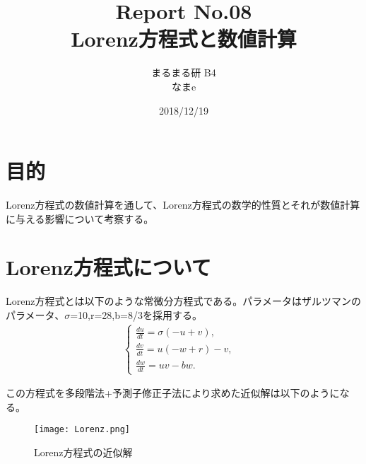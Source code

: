 \documentclass[12pt]{ltjsarticle}
\begin{document}
\begin{titlepage}
\title{Report No.08　\\ Lorenz方程式と数値計算}
\author{まるまる研 B4 \\ なまe}
\date{2018/12/19}
\maketitle

\end{titlepage}

\section{目的}
Lorenz方程式の数値計算を通して、Lorenz方程式の数学的性質とそれが数値計算に与える影響について考察する。

\section{Lorenz方程式について}
Lorenz方程式とは以下のような常微分方程式である。パラメータはザルツマンのパラメータ、$\sigma$=10,r=28,b=8/3を採用する。
\begin{eqnarray}
    \begin{cases}
        \frac{du}{dt} = \sigma(-u+v), & \\
        \frac{dv}{dt} = u(-w+r)-v, & \\
        \frac{dw}{dt} = uv-bw. &
    \end{cases}
    \label{newton}
\end{eqnarray}

この方程式を多段階法+予測子修正子法により求めた近似解は以下のようになる。
\begin{figure}[htbp]
    \begin{center}
    \texttt{[image: Lorenz.png]}
    \caption{Lorenz方程式の近似解}
        \end{center}
\end{figure}
\end{document}
